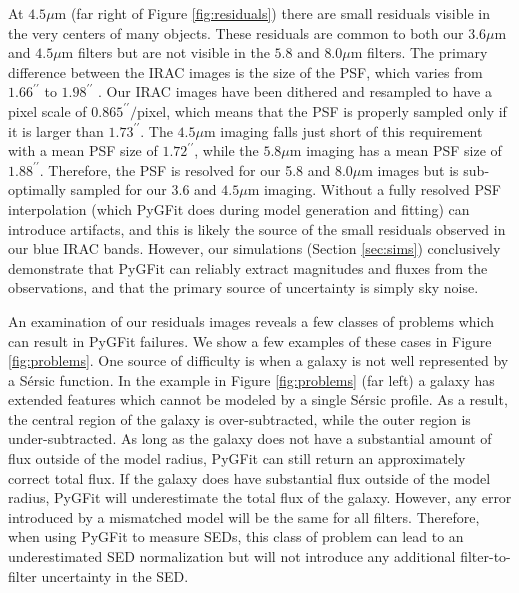 \documentclass[apj]{emulateapj}
\newcommand{\sersic}{S\'{e}rsic}
\newcommand{\pygfit}{PyGFit}
\begin{document}
At $4.5\mu$m (far right of Figure \ref{fig:residuals}) there are small residuals visible in the very centers of many objects.  These residuals are common to both our $3.6\mu$m and $4.5\mu$m filters but are not visible in the $5.8$ and $8.0\mu$m filters.  The primary difference between the IRAC images is the size of the PSF, which varies from $1.66^{\prime\prime}$ to $1.98^{\prime\prime}$ \citep{irac}.  Our IRAC images have been dithered and resampled to have a pixel scale of $0.865^{\prime\prime}/$pixel, which means that the PSF is properly sampled only if it is larger than $1.73^{\prime\prime}$.  The $4.5\mu$m imaging falls just short of this requirement with a mean PSF size of $1.72^{\prime\prime}$, while the $5.8\mu$m imaging has a mean PSF size of $1.88^{\prime\prime}$.  Therefore, the PSF is resolved for our 5.8 and $8.0\mu$m images but is sub-optimally sampled for our 3.6 and $4.5\mu$m imaging.  Without a fully resolved PSF interpolation (which \pygfit{} does during model generation and fitting) can introduce artifacts, and this is likely the source of the small residuals observed in our blue IRAC bands.  However, our simulations (Section \ref{sec:sims}) conclusively demonstrate that \pygfit{} can reliably extract magnitudes and fluxes from the observations, and that the primary source of uncertainty is simply sky noise.

An examination of our residuals images reveals a few classes of problems which can result in \pygfit{} failures.  We show a few examples of these cases in Figure \ref{fig:problems}.  One source of difficulty is when a galaxy is not well represented by a \sersic{} function.  In the example in Figure \ref{fig:problems} (far left) a galaxy has extended features which cannot be modeled by a single \sersic{} profile.  As a result, the central region of the galaxy is over-subtracted, while the outer region is under-subtracted.  As long as the galaxy does not have a substantial amount of flux outside of the model radius, \pygfit{} can still return an approximately correct total flux.  If the galaxy does have substantial flux outside of the model radius, \pygfit{} will underestimate the total flux of the galaxy.  However, any error introduced by a mismatched model will be the same for all filters.  Therefore, when using \pygfit{} to measure SEDs, this class of problem can lead to an underestimated SED normalization but will not introduce any additional filter-to-filter uncertainty in the SED.
\end{document}
